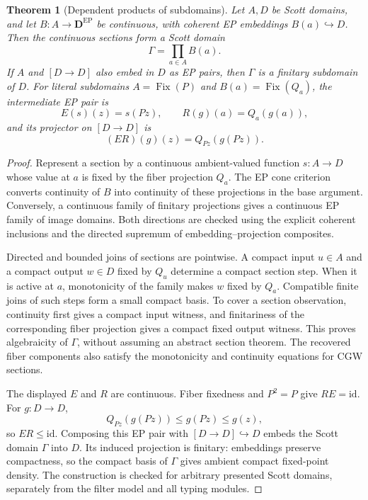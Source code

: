 \documentclass[11pt,a4paper]{article}
\newtheorem{theorem}{Theorem}[section]
\theoremstyle{definition}
\theoremstyle{remark}
\begin{document}
\begin{theorem}[Dependent products of subdomains]\label{thm:dependent-subdomain}
Let $A,D$ be Scott domains, and let $B:A\to\mathbf D^{\mathrm{EP}}$
be continuous, with coherent EP embeddings $B(a)\hookrightarrow D$.
Then the continuous sections form a Scott domain
\[
 \Gamma=\prod_{a\in A}B(a).
\]
If $A$ and $[D\to D]$ also embed in $D$ as EP pairs, then $\Gamma$
is a finitary subdomain of $D$.
For literal subdomains $A=\operatorname{Fix}(P)$ and
$B(a)=\operatorname{Fix}(Q_a)$, the intermediate EP pair is
\[
 E(s)(z)=s(Pz),\qquad R(g)(a)=Q_a(g(a)),
\]
and its projector on $[D\to D]$ is
\[
 (ER)(g)(z)=Q_{Pz}(g(Pz)).
\]
\end{theorem}
\begin{proof}
Represent a section by a continuous ambient-valued function $s:A\to D$
whose value at $a$ is fixed by the fiber projection $Q_a$.
The EP cone criterion converts continuity of $B$ into continuity of these
projections in the base argument. Conversely, a continuous family of
finitary projections gives a continuous EP family of image domains.
Both directions are checked using the explicit coherent inclusions and
the directed supremum of embedding--projection composites.

Directed and bounded joins of sections are pointwise. A compact input
$u\in A$ and a compact output $w\in D$ fixed by $Q_u$ determine a
compact section step. When it is active at $a$, monotonicity of the
family makes $w$ fixed by $Q_a$. Compatible finite joins of such steps
form a small compact basis. To cover a section observation, continuity
first gives a compact input witness, and finitariness of the corresponding
fiber projection gives a compact fixed output witness. This proves
algebraicity of $\Gamma$, without assuming an abstract section theorem.
The recovered fiber components also satisfy the monotonicity and
continuity equations for CGW sections.

The displayed $E$ and $R$ are continuous. Fiber fixedness and $P^2=P$
give $RE=\mathrm{id}$. For $g:D\to D$,
\[
 Q_{Pz}(g(Pz))\leq g(Pz)\leq g(z),
\]
so $ER\leq\mathrm{id}$. Composing this EP pair with $[D\to D]\hookrightarrow D$
embeds the Scott domain $\Gamma$ into $D$. Its induced projection is
finitary: embeddings preserve compactness, so the compact basis of
$\Gamma$ gives ambient compact fixed-point density.
The construction is checked for arbitrary presented Scott domains,
separately from the filter model and all typing modules.
\end{proof}
\end{document}
